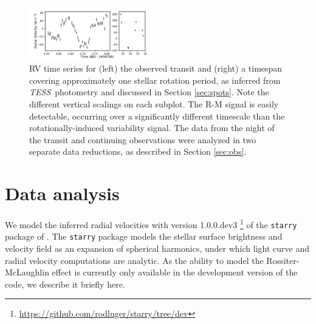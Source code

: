 \documentclass[twocolumn]{aastex63}
\newcommand{\tess}{{\it TESS}}
\begin{document}
\begin{figure}[!tbh]
  \begin{center}
    \includegraphics[width=0.5\textwidth, trim={0cm 0.0cm 0cm 0cm}, clip=true]{../figures/all_data.pdf}
   \end{center}
  \caption{RV time series for (left) the observed transit and (right) a timespan covering approximately one stellar rotation period, as inferred from \tess\ photometry and discussed in Section \ref{sec:spots}. Note the different vertical scalings on each subplot. The R-M signal is easily detectable, occurring over a significantly different timescale than the rotationally-induced variability signal. The data from the night of the transit and continuing observations were analyzed in two separate data reductions, as described in Section \ref{sec:obs}.}
  \label{fig:data}
\end{figure}



\section{Data analysis}
\label{sec:analysis}

We model the inferred radial velocities with version 1.0.0.dev3%
\footnote{\url{https://github.com/rodluger/starry/tree/dev}}%
of the \texttt{starry} package of \citet{Luger19}. The \texttt{starry} package models the stellar surface brightness and velocity field as an expansion of spherical harmonics, under which light curve and radial velocity computations are analytic. As the ability to model the Rossiter-McLaughlin effect is currently only available in the development version of the code, we describe it briefly here.
\end{document}
